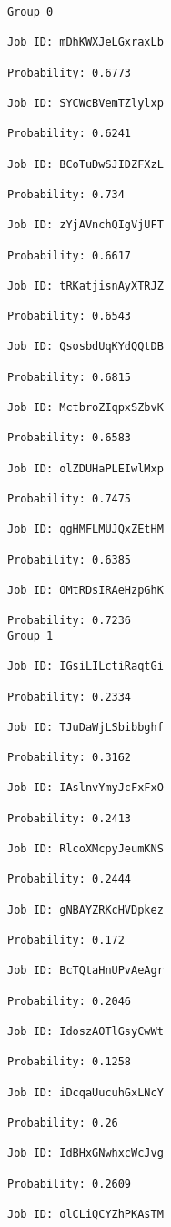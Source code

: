 \documentclass[11pt]{article}
\begin{document}
    \begin{Verbatim}[commandchars=\\\{\}]
Group 0

Job ID: mDhKWXJeLGxraxLb

Probability: 0.6773

Job ID: SYCWcBVemTZlylxp

Probability: 0.6241

Job ID: BCoTuDwSJIDZFXzL

Probability: 0.734

Job ID: zYjAVnchQIgVjUFT

Probability: 0.6617

Job ID: tRKatjisnAyXTRJZ

Probability: 0.6543

Job ID: QsosbdUqKYdQQtDB

Probability: 0.6815

Job ID: MctbroZIqpxSZbvK

Probability: 0.6583

Job ID: olZDUHaPLEIwlMxp

Probability: 0.7475

Job ID: qgHMFLMUJQxZEtHM

Probability: 0.6385

Job ID: OMtRDsIRAeHzpGhK

Probability: 0.7236
Group 1

Job ID: IGsiLILctiRaqtGi

Probability: 0.2334

Job ID: TJuDaWjLSbibbghf

Probability: 0.3162

Job ID: IAslnvYmyJcFxFxO

Probability: 0.2413

Job ID: RlcoXMcpyJeumKNS

Probability: 0.2444

Job ID: gNBAYZRKcHVDpkez

Probability: 0.172

Job ID: BcTQtaHnUPvAeAgr

Probability: 0.2046

Job ID: IdoszAOTlGsyCwWt

Probability: 0.1258

Job ID: iDcqaUucuhGxLNcY

Probability: 0.26

Job ID: IdBHxGNwhxcWcJvg

Probability: 0.2609

Job ID: olCLiQCYZhPKAsTM


\end{Verbatim}
\end{document}
